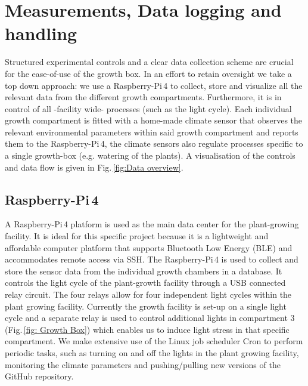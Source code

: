 \documentclass[reprint,superscriptaddress,aps,amsmath,amssymb]{revtex4-1}
\begin{document}
\section{Measurements, Data logging and handling}
Structured experimental controls and a clear data collection scheme are crucial for the ease-of-use of the growth box. In an effort to retain oversight we take a top down approach: we use a Raspberry-Pi\,4 to collect, store and visualize all the relevant data from the different growth compartments. Furthermore, it is in control of all -facility wide- processes (such as the light cycle). Each individual growth compartment is fitted with a home-made climate sensor that observes the relevant environmental parameters within said growth compartment and reports them to the Raspberry-Pi\,4, the climate sensors also regulate processes specific to a single growth-box (e.g. watering of the plants). A visualisation of the controls and data flow is given in Fig.\,\ref{fig:Data overview}.

\subsection{Raspberry-Pi\,4}
A Raspberry-Pi\,4 platform is used as the main data center for the plant-growing facility. It is ideal for this specific project because it is a lightweight and affordable computer platform that supports Bluetooth Low Energy (BLE) and accommodates remote access via SSH. The Raspberry-Pi\,4 is used to collect and store the sensor data from the individual growth chambers in a database. It controls the light cycle of the plant-growth facility through a USB connected relay circuit. The four relays allow for four independent light cycles within the plant growing facility. Currently the growth facility is set-up on a single light cycle and a separate relay is used to control additional lights in compartment 3 (Fig.\,\ref{fig: Growth Box}) which enables us to induce light stress in that specific compartment.
We make extensive use of the Linux job scheduler Cron to perform periodic tasks, such as turning on and off the lights in the plant growing facility, monitoring the climate parameters and pushing/pulling new versions of the GitHub repository.
\end{document}
